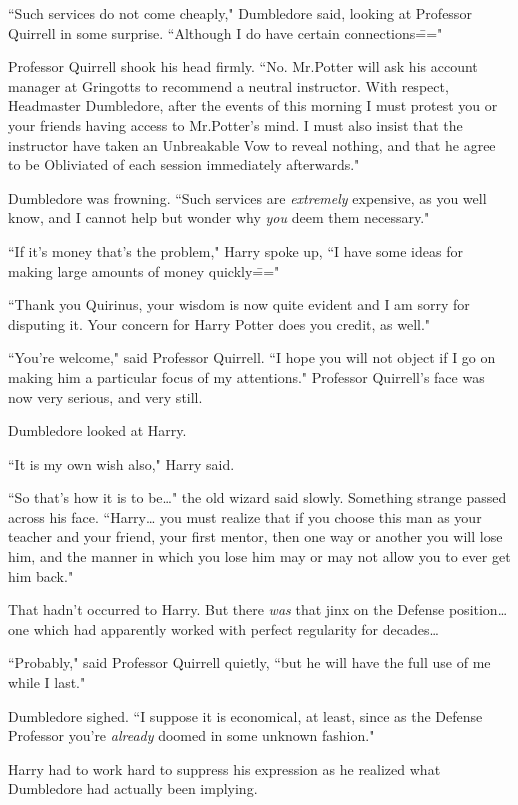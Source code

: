 ``Such services do not come cheaply," Dumbledore said, looking at Professor Quirrell in some surprise. ``Although I do have certain connections\==="

Professor Quirrell shook his head firmly. ``No. Mr.\?Potter will ask his account manager at Gringotts to recommend a neutral instructor. With respect, Headmaster Dumbledore, after the events of this morning I must protest you or your friends having access to Mr.\?Potter's mind. I must also insist that the instructor have taken an Unbreakable Vow to reveal nothing, and that he agree to be Obliviated of each session immediately afterwards."

Dumbledore was frowning. ``Such services are \emph{extremely} expensive, as you well know, and I cannot help but wonder why \emph{you} deem them necessary."

``If it's money that's the problem," Harry spoke up, ``I have some ideas for making large amounts of money quickly\==="

``Thank you Quirinus, your wisdom is now quite evident and I am sorry for disputing it. Your concern for Harry Potter does you credit, as well."

``You're welcome," said Professor Quirrell. ``I hope you will not object if I go on making him a particular focus of my attentions." Professor Quirrell's face was now very serious, and very still.

Dumbledore looked at Harry.

``It is my own wish also," Harry said.

``So that's how it is to be{\ldots}" the old wizard said slowly. Something strange passed across his face. ``Harry{\ldots} you must realize that if you choose this man as your teacher and your friend, your first mentor, then one way or another you will lose him, and the manner in which you lose him may or may not allow you to ever get him back."

That hadn't occurred to Harry. But there \emph{was} that jinx on the Defense position{\ldots} one which had apparently worked with perfect regularity for decades{\ldots}

``Probably," said Professor Quirrell quietly, ``but he will have the full use of me while I last."

Dumbledore sighed. ``I suppose it is economical, at least, since as the Defense Professor you're \emph{already} doomed in some unknown fashion."

Harry had to work hard to suppress his expression as he realized what Dumbledore had actually been implying.

